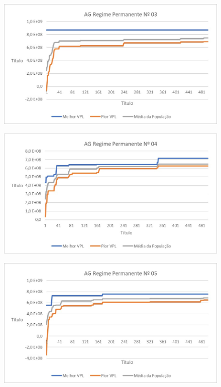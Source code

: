\documentclass[12pt,a4paper]{report}
\begin{document}
\begin{figure}[H]
\centering

\includegraphics[scale=1]{AGRP/3}

\end{figure}

\begin{figure}[H]
\centering

\includegraphics[scale=1]{AGRP/4}

\end{figure}

\begin{figure}[H]
\centering

\includegraphics[scale=1]{AGRP/5}

\end{figure}
\end{document}
